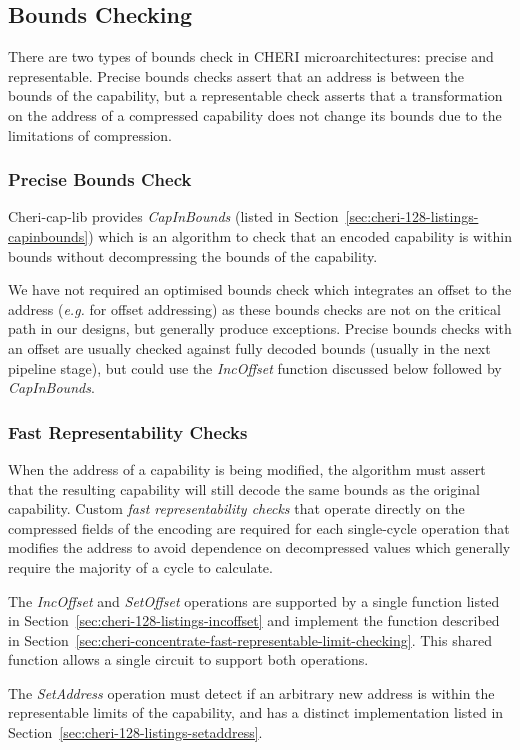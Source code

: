 \subsection{Bounds Checking}
There are two types of bounds check in CHERI microarchitectures: precise and representable.
Precise bounds checks assert that an address is between the bounds of the capability,
but a representable check asserts that a transformation on the address of a compressed capability
does not change its bounds due to the limitations of compression.
\subsubsection{Precise Bounds Check}
Cheri-cap-lib provides \emph{CapInBounds} (listed in Section~\ref{sec:cheri-128-listings-capinbounds}) which is an algorithm to check that an encoded capability is within bounds without
decompressing the bounds of the capability.

We have not required an optimised bounds check which integrates an offset to the address (\textit{e.g.} for offset addressing) as these
bounds checks are not on the critical path in our designs, but generally produce exceptions.
Precise bounds checks with an offset are usually checked against fully decoded bounds (usually in the next pipeline stage),
but could use the \emph{IncOffset} function discussed below followed by \emph{CapInBounds}.

\subsubsection{Fast Representability Checks}
When the address of a capability is being modified, the algorithm must assert that the resulting capability will still decode the same bounds as the original capability.
Custom \emph{fast representability checks} that operate directly on the compressed fields of the encoding are required for each single-cycle operation that modifies the address to avoid dependence on decompressed values which generally require the majority of a cycle to calculate.

The \emph{IncOffset} and \emph{SetOffset} operations are supported by a single function listed in Section~\ref{sec:cheri-128-listings-incoffset} and implement the function described in Section~\ref{sec:cheri-concentrate-fast-representable-limit-checking}.
This shared function allows a single circuit to support both operations.

The \emph{SetAddress} operation must detect if an arbitrary new address is within the representable limits of the capability, and has a distinct implementation listed in Section~\ref{sec:cheri-128-listings-setaddress}.

